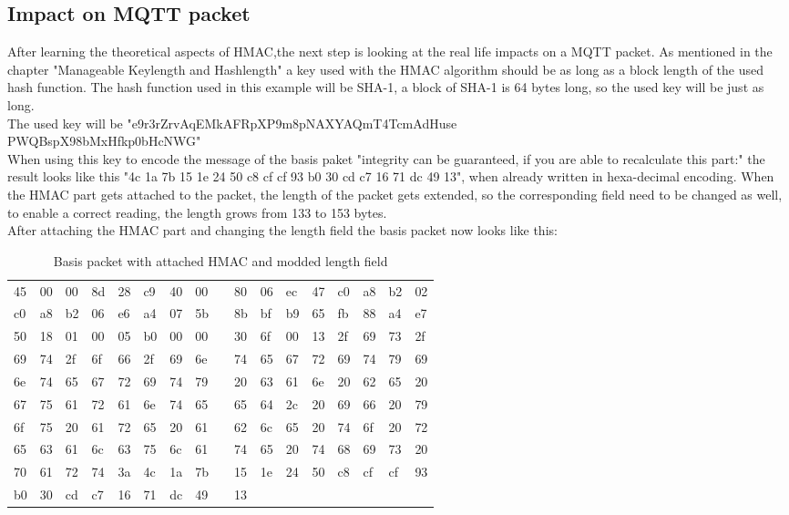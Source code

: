 \subsection{Impact on MQTT packet}
After learning the theoretical aspects of HMAC,the next step is looking at the real life impacts on a MQTT packet.
As mentioned in the chapter "Manageable Keylength and Hashlength" a key used with the HMAC algorithm should be as long as a block length of the used hash function. The hash function used in this example will be SHA-1, a block of SHA-1 is 64 bytes long, so the used key will be just as long. \\ The used key will be "e9r3rZrvAqEMkAFRpXP9m8pNAXYAQmT4TcmAdHuse\\PWQBspX98bMxHfkp0bHcNWG" \\
When using this key to encode the message of the basis paket "integrity can be guaranteed, if you are able to recalculate this part:" the result looks like this "4c 1a 7b 15 1e 24 50 c8 cf cf 93 b0 30 cd c7 16 71 dc 49 13", when already written in hexa-decimal encoding. When the HMAC part gets attached to the packet, the length of the packet gets extended, so the corresponding field need to be changed as well, to enable a correct reading, the length grows from 133 to 153 bytes.\\
After attaching the HMAC part and changing the length field the basis packet now looks like this:
\begin{table}[]
\centering
\begin{tabular}{lllllllllllllllll}
45 & 00 & 00 & 8d & 28 & c9 & 40 & 00 &  & 80 & 06 & ec & 47 & c0 & a8 & b2 & 02 \\
c0 & a8 & b2 & 06 & e6 & a4 & 07 & 5b &  & 8b & bf & b9 & 65 & fb & 88 & a4 & e7 \\
50 & 18 & 01 & 00 & 05 & b0 & 00 & 00 &  & 30 & 6f & 00 & 13 & 2f & 69 & 73 & 2f \\
69 & 74 & 2f & 6f & 66 & 2f & 69 & 6e &  & 74 & 65 & 67 & 72 & 69 & 74 & 79 & 69 \\
6e & 74 & 65 & 67 & 72 & 69 & 74 & 79 &  & 20 & 63 & 61 & 6e & 20 & 62 & 65 & 20 \\
67 & 75 & 61 & 72 & 61 & 6e & 74 & 65 &  & 65 & 64 & 2c & 20 & 69 & 66 & 20 & 79 \\
6f & 75 & 20 & 61 & 72 & 65 & 20 & 61 &  & 62 & 6c & 65 & 20 & 74 & 6f & 20 & 72 \\
65 & 63 & 61 & 6c & 63 & 75 & 6c & 61 &  & 74 & 65 & 20 & 74 & 68 & 69 & 73 & 20 \\
70 & 61 & 72 & 74 & 3a & 4c & 1a & 7b &  & 15 & 1e & 24 & 50 & c8 & cf & cf & 93 \\
b0 & 30 & cd & c7 & 16 & 71 & dc & 49 &  & 13 &    &    &    &    &    &    &    \\  
\end{tabular}
\caption{Basis packet with attached HMAC and modded length field}
\label{tab:MQTT-HMAC}
\end{table}


